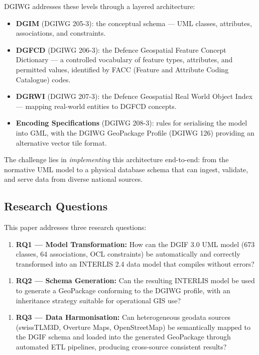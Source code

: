 \documentclass[conference]{IEEEtran}
\begin{document}
DGIWG addresses these levels through a layered architecture:

\begin{itemize}[leftmargin=*]
\item \textbf{DGIM} (DGIWG 205-3): the conceptual schema — UML classes, attributes, associations, and constraints.
\item \textbf{DGFCD} (DGIWG 206-3): the Defence Geospatial Feature Concept Dictionary — a controlled vocabulary of feature types, attributes, and permitted values, identified by FACC (Feature and Attribute Coding Catalogue) codes.
\item \textbf{DGRWI} (DGIWG 207-3): the Defence Geospatial Real World Object Index — mapping real-world entities to DGFCD concepts.
\item \textbf{Encoding Specifications} (DGIWG 208-3): rules for serialising the model into GML, with the DGIWG GeoPackage Profile (DGIWG 126) providing an alternative vector tile format.
\end{itemize}

The challenge lies in \textit{implementing} this architecture end-to-end: from the normative UML model to a physical database schema that can ingest, validate, and serve data from diverse national sources.

\subsection{Research Questions}

This paper addresses three research questions:

\begin{enumerate}[leftmargin=*]
\item \textbf{RQ1 — Model Transformation:} How can the DGIF 3.0 UML model (673 classes, 64 associations, OCL constraints) be automatically and correctly transformed into an INTERLIS 2.4 data model that compiles without errors?
\end{enumerate}

\begin{enumerate}[leftmargin=*]
\item \textbf{RQ2 — Schema Generation:} Can the resulting INTERLIS model be used to generate a GeoPackage conforming to the DGIWG profile, with an inheritance strategy suitable for operational GIS use?
\end{enumerate}

\begin{enumerate}[leftmargin=*]
\item \textbf{RQ3 — Data Harmonisation:} Can heterogeneous geodata sources (swissTLM3D, Overture Maps, OpenStreetMap) be semantically mapped to the DGIF schema and loaded into the generated GeoPackage through automated ETL pipelines, producing cross-source consistent results?
\end{enumerate}
\end{document}
